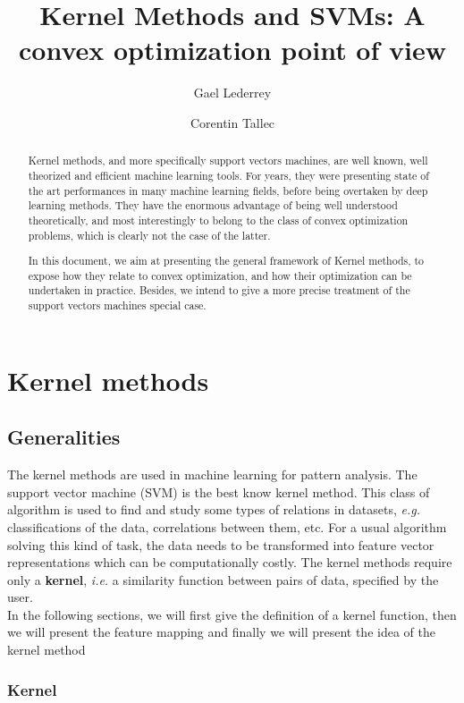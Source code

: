 \documentclass[a4paper, 11pt]{article}
\title{Kernel Methods and SVMs:
A convex optimization point of view}
\author{Gael Lederrey\\
  \and
Corentin Tallec}
\begin{document}
\maketitle
\begin{abstract}
  Kernel methods, and more specifically support vectors machines, are
  well known, well theorized and efficient machine learning tools. For
  years, they were presenting state of the art performances in many
  machine learning fields, before being overtaken by deep learning
  methods. They have the enormous advantage of being well understood
  theoretically, and most interestingly to belong to the class of
  convex optimization problems, which is clearly not the case of the
  latter.

  In this document, we aim at presenting the general framework of
  Kernel methods, to expose how they relate to convex optimization,
  and how their optimization can be undertaken in practice. Besides,
  we intend to give a more precise treatment of the support vectors
  machines special case.
\end{abstract}

\section{Kernel methods}
\subsection{Generalities}

The kernel methods are used in machine learning for pattern analysis. The support vector machine (SVM) is the best know kernel method. This class of algorithm is used to find and study some types of relations in datasets, {\it e.g.} classifications of the data, correlations between them, etc. For a usual algorithm solving this kind of task, the data needs to be transformed into feature vector representations which can be computationally costly. The kernel methods require only a {\bf kernel}, {\it i.e.} a similarity function between pairs of data, specified by the user. \\
In the following sections, we will first give the definition of a kernel function, then we will present the feature mapping and finally we will present the idea of the kernel method

\subsubsection{Kernel}
\end{document}
